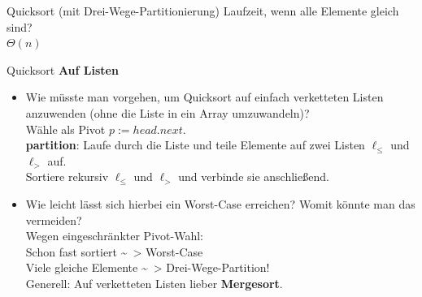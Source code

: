 

\begin{frame}{{\vspace{.3\baselineskip}Quicksort (mit Drei-Wege-Partitionierung)}}
	Laufzeit, wenn alle Elemente gleich sind? \\
	\pause
	\impl $\Theta(n)$
\end{frame}

\begin{frame}{Quicksort}
	\textbf{Auf Listen} \\ %
	\begin{itemize}
		\item Wie müsste man vorgehen, um Quicksort auf einfach verketteten Listen anzuwenden (ohne die Liste in ein Array umzuwandeln)? \\ 
		\pause
		\impl Wähle als Pivot $p := head.next$. \\ 
		\textbf{partition}: Laufe durch die Liste und teile Elemente auf zwei Listen $\ell_\leq$ und $\ell_>$ auf. \\
		Sortiere rekursiv $\ell_\leq$ und $\ell_>$ und verbinde sie anschließend.
		\item Wie leicht lässt sich hierbei ein Worst-Case erreichen? Womit könnte man das vermeiden? \\
		\pause
		\impl Wegen eingeschränkter Pivot-Wahl: \\
		Schon fast sortiert \~~> Worst-Case \\
		\impl Viele gleiche Elemente \~~> Drei-Wege-Partition! \\
		\impl Generell: Auf verketteten Listen lieber \textbf{Mergesort}.
	\end{itemize}
\end{frame}

